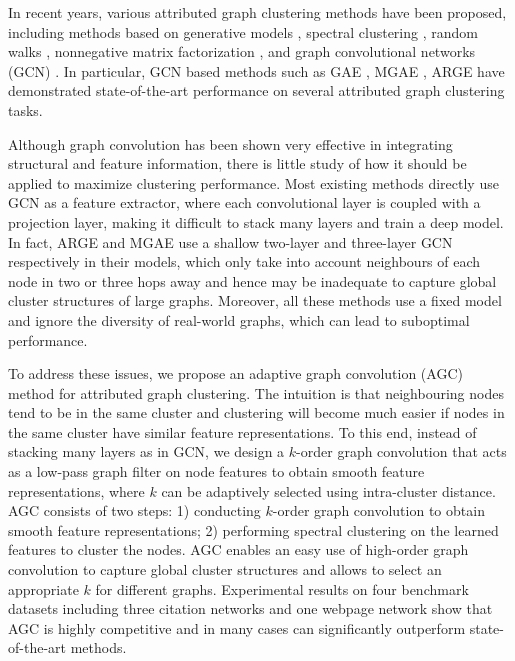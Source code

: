 \documentclass{article}
\begin{document}
In recent years, various attributed graph clustering methods have been proposed, including methods based on generative models \cite{chang2009relational}, spectral clustering \cite{xia2014robust}, random walks \cite{yang2015network}, nonnegative matrix factorization \cite{wang2016semantic}, and graph convolutional networks (GCN) \cite{kipf2016semi}. In particular, GCN based methods such as GAE \cite{kipf2016variational}, MGAE \cite{wang2017mgae}, ARGE \cite{pan2018adversarially} have demonstrated state-of-the-art performance on several attributed graph clustering tasks.

Although graph convolution has been shown very effective in integrating structural and feature information, there is little study of how it should be applied to maximize clustering performance. Most existing methods directly use GCN as a feature extractor, where each convolutional layer is coupled with a projection layer, making it difficult to stack many layers and train a deep model. In fact, ARGE \cite{pan2018adversarially} and MGAE \cite{wang2017mgae} use a shallow two-layer and three-layer GCN respectively in their models, which only take into account neighbours of each node in two or three hops away and hence may be inadequate to capture global cluster structures of large graphs. Moreover, all these methods use a fixed model and ignore the diversity of real-world graphs, which can lead to suboptimal performance.



To address these issues, we propose an adaptive graph convolution (AGC) method for attributed graph clustering. The intuition is that neighbouring nodes tend to be in the same cluster and clustering will become much easier if nodes in the same cluster have similar feature representations. To this end, instead of stacking many layers as in GCN, we design a $k$-order graph convolution that acts as a low-pass graph filter on node features to obtain smooth feature representations, where $k$ can be adaptively selected using intra-cluster distance. AGC consists of two steps: 1) conducting $k$-order graph convolution to obtain smooth feature representations; 2) performing spectral clustering on the learned features to cluster the nodes. AGC enables an easy use of high-order graph convolution to capture global cluster structures and allows to select an appropriate $k$ for different graphs.
Experimental results on four benchmark datasets including three citation networks and one webpage network show that AGC is highly competitive and in many cases can significantly outperform state-of-the-art methods.
\end{document}
